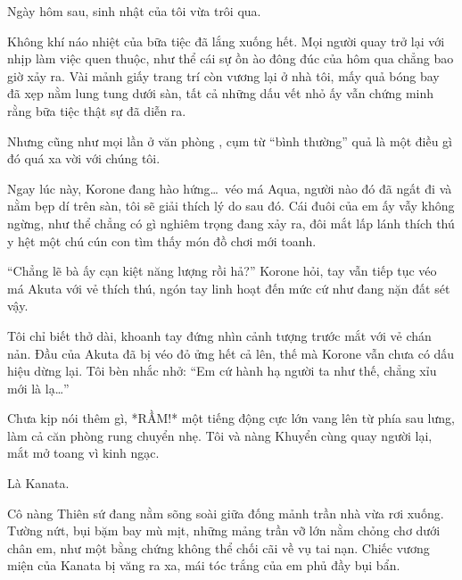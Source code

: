 \documentclass[../main.tex]{subfiles}
\begin{document}


Ngày hôm sau, sinh nhật của tôi vừa trôi qua.

Không khí náo nhiệt của bữa tiệc đã lắng xuống hết. Mọi người quay trở lại với nhịp làm việc quen thuộc, như thể cái sự ồn ào đông đúc của hôm qua chẳng bao giờ xảy ra. Vài mảnh giấy trang trí còn vương lại ở nhà tôi, mấy quả bóng bay đã xẹp nằm lung tung dưới sàn, tất cả những dấu vết nhỏ ấy vẫn chứng minh rằng bữa tiệc thật sự đã diễn ra.

Nhưng cũng như mọi lần ở văn phòng \hll, cụm từ ``bình thường'' quả là một điều gì đó quá xa vời với chúng tôi.

Ngay lúc này, Korone đang hào hứng\dots\ véo má Aqua, người nào đó đã ngất đi và nằm bẹp dí trên sàn, tôi sẽ giải thích lý do sau đó. Cái đuôi của em ấy vẫy không ngừng, như thể chẳng có gì nghiêm trọng đang xảy ra, đôi mắt lấp lánh thích thú y hệt một chú cún con tìm thấy món đồ chơi mới toanh.


``Chẳng lẽ bà ấy cạn kiệt năng lượng rồi hả?'' Korone hỏi, tay vẫn tiếp tục véo má Akuta với vẻ thích thú, ngón tay linh hoạt đến mức cứ như đang nặn đất sét vậy.

Tôi chỉ biết thở dài, khoanh tay đứng nhìn cảnh tượng trước mắt với vẻ chán nản. Đầu của Akuta đã bị véo đỏ ửng hết cả lên, thế mà Korone vẫn chưa có dấu hiệu dừng lại. Tôi bèn nhắc nhở: ``Em cứ hành hạ người ta như thế, chẳng xỉu mới là lạ\dots''

Chưa kịp nói thêm gì, *RẦM!* một tiếng động cực lớn vang lên từ phía sau lưng, làm cả căn phòng rung chuyển nhẹ. Tôi và nàng Khuyển cùng quay người lại, mắt mở toang vì kinh ngạc.

Là Kanata.


Cô nàng Thiên sứ đang nằm sõng soài giữa đống mảnh trần nhà vừa rơi xuống. Tường nứt, bụi bặm bay mù mịt, những mảng trần vỡ lớn nằm chỏng chơ dưới chân em, như một bằng chứng không thể chối cãi về vụ tai nạn. Chiếc vương miện của Kanata bị văng ra xa, mái tóc trắng của em phủ đầy bụi bẩn.
\end{document}
